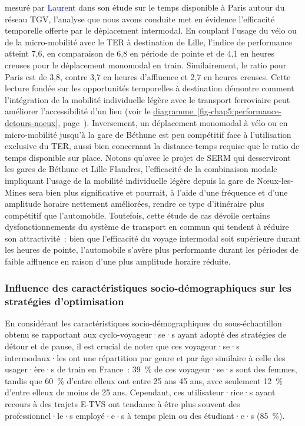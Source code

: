\begin{refsegment}
{} mesuré par \textcolor{blue}{Laurent} \textcolor{blue}{\textcite[130]{chapelon_transports_2016}} dans son étude sur le temps disponible à Paris autour du réseau \acrshort{TGV}, l'analyse que nous avons conduite met en évidence l'efficacité temporelle offerte par le déplacement intermodal. En couplant l'usage du vélo ou de la micro-mobilité avec le \acrshort{TER} à destination de Lille, l'indice de performance atteint 7,6, en comparaison de 6,8 en période de pointe et de 4,1 en heures creuses pour le déplacement monomodal en train. Similairement, le ratio pour Paris est de 3,8, contre 3,7 en heures d'affluence et 2,7 en heures creuses. Cette lecture fondée sur les opportunités temporelles à destination démontre comment l'intégration de la mobilité individuelle légère avec le transport ferroviaire peut améliorer l'accessibilité d'un lieu (voir le \hyperref[fig-chap5:performance-detours-noeux]{diagramme~\ref{fig-chap5:performance-detours-noeux}}, page~\pageref{fig-chap5:performance-detours-noeux}). Inversement, un déplacement monomodal à vélo ou en micro-mobilité jusqu'à la gare de Béthune est peu compétitif face à l'utilisation exclusive du \acrshort{TER}, aussi bien concernant la distance-temps requise que le ratio de temps disponible sur place. Notons qu'avec le projet de \acrfull{SERM} qui desserviront les gares de Béthune et Lille Flandres, l'efficacité de la combinaison modale impliquant l'usage de la mobilité individuelle légère depuis la gare de Nœux-les-Mines sera bien plus significative et pourrait, à l'aide d'une fréquence et d'une amplitude horaire nettement améliorées, rendre ce type d'itinéraire plus compétitif que l'automobile. Toutefois, cette étude de cas dévoile certains dysfonctionnements du système de transport en commun qui tendent à réduire son attractivité~: bien que l'efficacité du voyage intermodal soit supérieure durant les heures de pointe, l'automobile s'avère plus performante durant les périodes de faible affluence en raison d'une plus amplitude horaire réduite.%

\subsubsection*{Influence des caractéristiques socio-démographiques sur les stratégies d'optimisation
    \label{chap5:sociodemographie}
    }

En considérant les caractéristiques socio-démographiques du sous-échantillon obtenu se rapportant aux cyclo-voyageur·se·s ayant adopté des stratégies de détour et de pause, il est crucial de noter que ces voyageur·se·s intermodaux·les ont une répartition par \gls{genre} et par âge similaire à celle des usager·ère·s de train en France~: 39~\% de ces voyageur·se·s sont des femmes, tandis que 60~\% d'entre elleux ont entre 25 ans 45 ans, avec seulement 12~\% d'entre elleux de moins de 25 ans. Cependant, ces utilisateur·rice·s ayant recours à des trajets \acrshort{E-TVS} ont tendance à être plus souvent des professionnel·le·s employé·e·s à temps plein ou des étudiant·e·s (85~\%).%


\end{refsegment}
